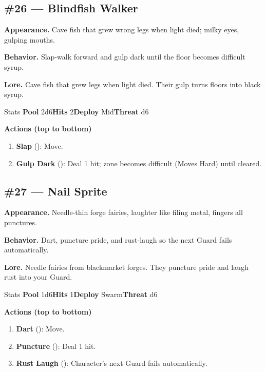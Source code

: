 \subsection*{\#26 --- Blindfish Walker}

\textbf{Appearance.} Cave fish that grew wrong legs when light died; milky eyes, gulping mouths.

\textbf{Behavior.} Slap-walk forward and gulp dark until the floor becomes difficult syrup.

\textbf{Lore.} Cave fish that grew legs when light died. Their gulp turns floors into black syrup.

\begin{monsterentry}{Stats}
\textbf{Pool} 2d6\quad\textbf{Hits} 2\quad\textbf{Deploy} Mid\quad\textbf{Threat} d6

\textbf{Actions (top to bottom)}
\begin{enumerate}\setlength{\itemsep}{0.15em}\setlength{\parskip}{0pt}
  \item \textbf{Slap} (\easy): Move.
  \item \textbf{Gulp Dark} (\medium): Deal 1 hit; zone becomes difficult (Moves Hard) until cleared.
\end{enumerate}
\end{monsterentry}

\subsection*{\#27 --- Nail Sprite}

\textbf{Appearance.} Needle-thin forge fairies, laughter like filing metal, fingers all punctures.

\textbf{Behavior.} Dart, puncture pride, and rust-laugh so the next Guard fails automatically.

\textbf{Lore.} Needle fairies from blackmarket forges. They puncture pride and laugh rust into your Guard.

\begin{monsterentry}{Stats}
\textbf{Pool} 1d6\quad\textbf{Hits} 1\quad\textbf{Deploy} Swarm\quad\textbf{Threat} d6

\textbf{Actions (top to bottom)}
\begin{enumerate}\setlength{\itemsep}{0.15em}\setlength{\parskip}{0pt}
  \item \textbf{Dart} (\easy): Move.
  \item \textbf{Puncture} (\easy): Deal 1 hit.
  \item \textbf{Rust Laugh} (\medium): Character's next Guard fails automatically.
\end{enumerate}
\end{monsterentry}

